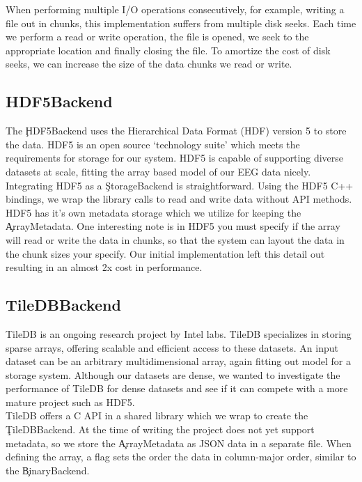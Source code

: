 When performing multiple I/O operations consecutively, for example, writing a
file out in chunks, this implementation suffers from multiple disk seeks. Each
time we perform a read or write operation, the file is opened, we seek to the
appropriate location and finally closing the file. To amortize the cost of disk
seeks, we can increase the size of the data chunks we read or write.

\subsection{HDF5Backend}\label{storage-ch:implementation-hdf5}

The \c{HDF5Backend} uses the Hierarchical Data Format (HDF) version 5
\cite{hdf5} to store the data. HDF5 is an open source `technology suite' which
meets the requirements for storage for our system. HDF5 is capable of
supporting diverse datasets at scale, fitting the array based model of our
EEG data nicely. \\

Integrating HDF5 as a \c{StorageBackend} is straightforward. Using the HDF5 C++
bindings, we wrap the library calls to read and write data without API methods.
HDF5 has it's own metadata storage which we utilize for keeping the
\c{ArrayMetadata}. One interesting note is in HDF5 you must specify if the
array will read or write the data in chunks, so that the system can layout the
data in the chunk sizes your specify. Our initial implementation left this
detail out resulting in an almost 2x cost in performance.

\subsection{TileDBBackend}\label{storage-ch:implementation-tiledb}

TileDB\cite{tiledb} is an ongoing research project by Intel labs. TileDB
specializes in storing sparse arrays, offering scalable and efficient access to
these datasets. An input dataset can be an arbitrary multidimensional array,
again fitting out model for a storage system. Although our datasets are dense,
we wanted to investigate the performance of TileDB for dense datasets and see
if it can compete with a more mature project such as HDF5.\\

TileDB offers a C API in a shared library which we wrap to create the
\c{TileDBBackend}. At the time of writing the project does not yet support
metadata, so we store the \c{ArrayMetadata} as JSON data in a separate file.
When defining the array, a flag sets the order the data in column-major order,
similar to the \c{BinaryBackend}. \\

